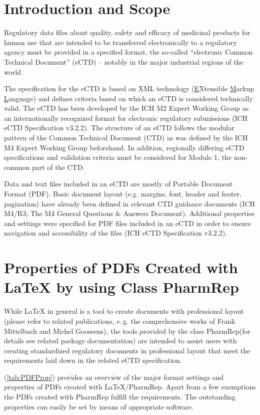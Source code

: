\documentclass{pharmrep}
\newcommand{\PharmRep}{\textsf{PharmRep}\xspace}
\newcommand{\eg}{e.\,g.\xspace}
\begin{document}
\section{Introduction and Scope}
Regulatory data files about quality, safety and efficacy of medicinal products for human use that are intended to be transferred electronically to a regulatory agency must be provided in a specified format, the so-called \enquote{electronic Common Technical Document} (eCTD) -- notably in the major industrial regions of the world.

The specification for the eCTD is based on XML technology (\underline{E}Xtensible \underline{M}arkup \underline{L}anguage) and defines criteria based on which an eCTD is considered technically valid. The eCTD has been developed by the ICH M2 Expert Working Group  as an internationally recognized format for electronic regulatory submissions (ICH eCTD Specification v3.2.2). The structure of an eCTD follows the modular pattern of the Common Technical Document (CTD) as was defined by the ICH M4 Expert Working Group beforehand. In addition, regionally differing eCTD specifications and validation criteria must be considered for Module 1, the non-common part of the CTD.

Data and text files included in an eCTD are mostly of Portable Document Format (PDF). Basic document layout (e.g. margins, font, header and footer, pagination) have already been defined in relevant CTD guidance documents (ICH M4/R3; The M4 General Questions \& Answers Document). Additional properties and settings were specified for PDF files included in an eCTD  in order to ensure navigation and accessibility of the files (ICH eCTD Specification v3.2.2).

\section{Properties of PDFs Created with \LaTeX{} by using Class PharmRep}
While \LaTeX{} in general is a tool to create documents with professional layout (please refer to related publications, \eg the comprehensive works of Frank Mittelbach and Michel Goossens), the tools provided by the class \PharmRep (for details see related package documentation) are intended to assist users with creating standardized regulatory documents in professional layout that meet the requirements laid down in the related eCTD specification.

(\autoref{tab:PDFProp}) provides an overview of the major format settings and properties of PDFs created with \LaTeX{}/PharmRep. Apart from a few exemptions the PDFs created with \PharmRep fulfill the requirements. The outstanding properties can easily be set by means of appropriate software.
\end{document}
